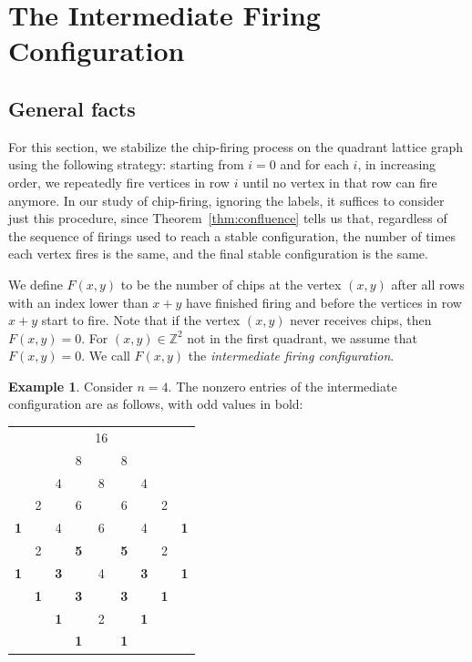 \documentclass[11pt]{article}
\theoremstyle{definition}
\newtheorem{example}{Example}
\theoremstyle{remark}
\begin{document}
\section{The Intermediate Firing Configuration}\label{sec:IntermedFiringConfig}

\subsection{General facts}

For this section, we stabilize the chip-firing process on the quadrant lattice graph using the following strategy: starting from $i=0$ and for each $i$, in increasing order, we repeatedly fire vertices in row $i$ until no vertex in that row can fire anymore. In our study of chip-firing, ignoring the labels, it suffices to consider just this procedure, since Theorem~\ref{thm:confluence} tells us that, regardless of the sequence of firings used to reach a stable configuration, the number of times each vertex fires is the same, and the final stable configuration is the same.

We define $F(x,y)$ to be the number of chips at the vertex $(x,y)$ after all rows with an index lower than $x+y$ have finished firing and before the vertices in row $x+y$ start to fire. Note that if the vertex $(x,y)$ never receives chips, then $F(x,y) = 0$. For $(x, y) \in \mathbb{Z}^2$ not in the first quadrant, we assume that $F(x, y) = 0$. We call $F(x, y)$ the \textit{intermediate firing configuration}.

\begin{example}
\label{ex:n=4}
  Consider $n=4$. The nonzero entries of the intermediate configuration are as follows, with odd values in bold:
\begin{center}
  \begin{tabular}{ccccccccc}
        & & &  & 16  & & &  \\
      &  & & 8 &  &  8 & &  \\  
      & & 4 &  & 8 & &  4 & \\ 
      & 2 & & 6 & & 6 & & 2 \\ 
      \textbf{1} & & 4 & & 6 & & 4  &  & \textbf{1} \\ 
      & 2 & & \textbf{5} & & \textbf{5}  & & 2 \\ 
      \textbf{1} & & \textbf{3} & & 4 & & \textbf{3} & & \textbf{1} 
      \\  & \textbf{1} & & \textbf{3} & & \textbf{3} & & \textbf{1} \\ & & \textbf{1} & & 2 & & \textbf{1} \\ 
      & & & \textbf{1} & & \textbf{1} & & &
  \end{tabular}   
\end{center}
\end{example}
\end{document}
